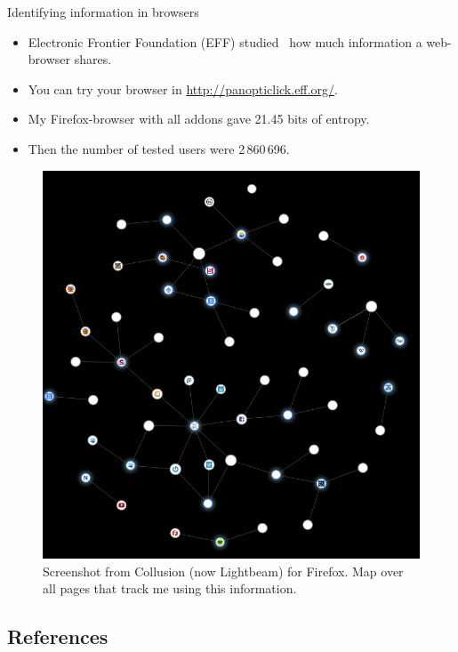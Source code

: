\begin{frame}
  \begin{block}{Identifying information in browsers}
    \begin{itemize}
      \item Electronic Frontier Foundation (EFF) studied~\cite{Eckersley2010hui} 
        how much information a web-browser shares.

      \item You can try your browser in \url{http://panopticlick.eff.org/}.
    \end{itemize}
  \end{block}

  \pause{}

  \begin{example}[My browser]
    \begin{itemize}
      \item My Firefox-browser with all addons gave 21.45 bits of entropy.

      \item Then the number of tested users were 2\,860\,696.
    \end{itemize}
  \end{example}
\end{frame}

\begin{frame}
  \begin{figure}
    \includegraphics[height=0.7\textheight]{collusion.png}
    \caption{Screenshot from Collusion (now Lightbeam) for Firefox.
      Map over all pages that track me using this information.}
  \end{figure}
\end{frame}



\subsection*{References}
\begin{frame}[allowframebreaks]
	\small
  \printbibliography{}
\end{frame}

